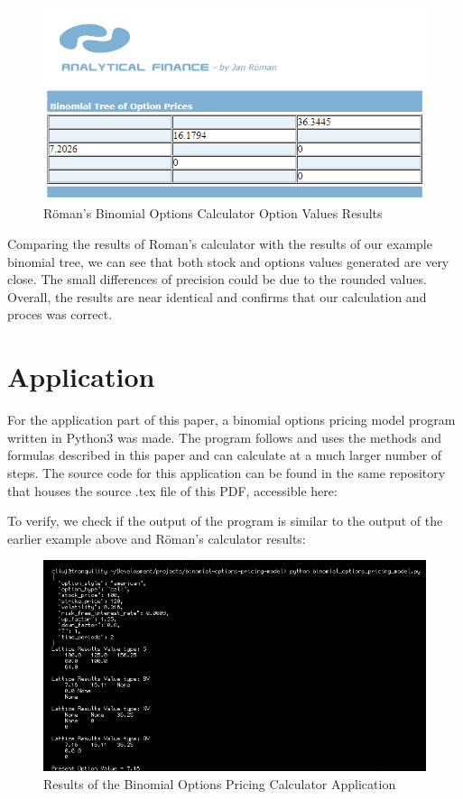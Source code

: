 \documentclass[12pt, letterpaper]{article}\usepackage{float}
\begin{document}
\begin{figure}[H]
  \includegraphics{Roman_binomial_calculator_option_values}
  \caption{R\"{o}man's Binomial Options Calculator Option Values Results}
\end{figure}

Comparing the results of Roman's calculator with the results of our example binomial tree, we can see that both stock and options values generated are very close.
The small differences of precision could be due to the rounded values.
Overall, the results are near identical and confirms that our calculation and proces was correct.

\pagebreak

\section*{Application}
For the application part of this paper, a binomial options pricing model program written in Python3 was made.
The program follows and uses the methods and formulas described in this paper and can calculate at a much larger number of steps.
The source code for this application can be found in the same repository that houses the source .tex file of this PDF, accessible here:
\href{https://github.com/cliuj/binomial-options-pricing-model}{\color{blue}{https://github.com/cliuj/binomial-options-pricing-model}}

To verify, we check if the output of the program is similar to the output of the earlier example above and R\"{o}man's calculator results:

\begin{figure}[H]
  \includegraphics[scale=0.66]{bopm_output_screenshot.png}
  \caption{Results of the Binomial Options Pricing Calculator Application}
\end{figure}
\end{document}
